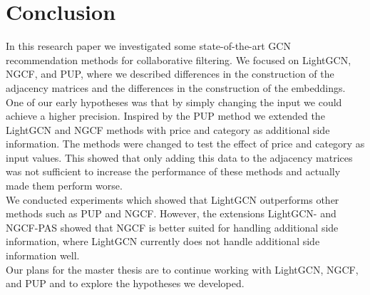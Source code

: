 \section{Conclusion}
In this research paper we investigated some state-of-the-art GCN recommendation methods for collaborative filtering.
We focused on LightGCN, NGCF, and PUP, where we described differences in the construction of the adjacency matrices and the differences in the construction of the embeddings.
\\
One of our early hypotheses was that by simply changing the input we could achieve a higher precision.
Inspired by the PUP method we extended the LightGCN and NGCF methods with price and category as additional side information.
The methods were changed to test the effect of price and category as input values.
This showed that only adding this data to the adjacency matrices was not sufficient to increase the performance of these methods and actually made them perform worse.
\\
We conducted experiments which showed that LightGCN outperforms other methods such as PUP and NGCF.
However, the extensions LightGCN- and NGCF-PAS showed that NGCF is better suited for handling additional side information, where LightGCN currently does not handle additional side information well.
\\
Our plans for the master thesis are to continue working with LightGCN, NGCF, and PUP and to explore the hypotheses we developed.
